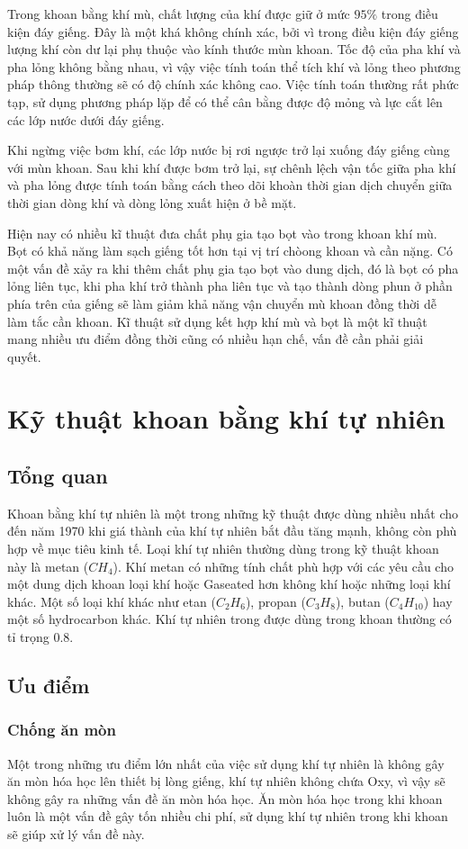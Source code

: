 \documentclass[13pt,a4paper]{article}
\begin{document}
	Trong khoan bằng khí mù, chất lượng của khí được giữ ở mức $95\%$ trong điều kiện đáy giếng. Đây là một khá không chính xác, bởi vì trong điều kiện đáy giếng lượng khí còn dư lại phụ thuộc vào kính thước mùn khoan. Tốc độ của pha khí và pha lỏng không bằng nhau, vì vậy việc tính toán thể tích khí và lỏng theo phương pháp thông thường sẽ có độ chính xác không cao. Việc tính toán thường rất phức tạp, sử dụng phương pháp lặp để có thể cân bằng được độ mỏng và lực cắt lên các lớp nước dưới đáy giếng.\par
	Khi ngừng việc bơm khí, các lớp nước bị rơi ngược trở lại xuống đáy giếng cùng với mùn khoan. Sau khi khí được bơm trở lại, sự chênh lệch vận tốc giữa pha khí và pha lỏng được tính toán bằng cách theo dõi khoàn thời gian dịch chuyển giữa thời gian dòng khí và dòng lỏng xuất hiện ở bề mặt.\par
	Hiện nay có nhiều kĩ thuật đưa chất phụ gia tạo bọt vào trong khoan khí mù. Bọt có khả năng làm sạch giếng tốt hơn tại vị trí chòong khoan và cần nặng. Có một vấn đề xảy ra khi thêm chất phụ gia tạo bọt vào dung dịch, đó là bọt có pha lỏng liên tục, khi pha khí trở thành pha liên tục và tạo thành dòng phun ở phần phía trên của giếng sẽ làm giảm khả năng vận chuyển mù khoan đồng thời dễ làm tắc cần khoan. Kĩ thuật sử dụng kết hợp khí mù và bọt là một kĩ thuật mang nhiều ưu điểm đồng thời cũng có nhiều hạn chế, vấn đề cần phải giải quyết.
\section{Kỹ thuật khoan bằng khí tự nhiên}
\subsection{Tổng quan}
	Khoan bằng khí tự nhiên là một trong những kỹ thuật được dùng nhiều nhất cho đến năm 1970 khi giá thành của khí tự nhiên bắt đầu tăng mạnh, không còn phù hợp về mục tiêu kinh tế. Loại khí tự nhiên thường dùng trong kỹ thuật khoan này là metan ($CH_4$). Khí metan có những tính chất phù hợp với các yêu cầu cho một dung dịch khoan loại khí hoặc Gaseated hơn không khí hoặc những loại khí khác. Một số loại khí khác như etan ($C_2H_6$), propan ($C_3H_8$), butan ($C_4H_{10}$) hay một số hydrocarbon khác. Khí tự nhiên trong được dùng trong khoan thường có tỉ trọng 0.8.
\subsection{Ưu điểm}
\subsubsection{Chống ăn mòn}
	Một trong những ưu điểm lớn nhất của việc sử dụng khí tự nhiên là không gây ăn mòn hóa học lên thiết bị lòng giếng, khí tự nhiên không chứa Oxy, vì vậy sẽ không gây ra những vấn đề ăn mòn hóa học. Ăn mòn hóa học trong khi khoan luôn là một vấn đề gây tốn nhiều chi phí, sử dụng khí tự nhiên trong khi khoan sẽ giúp xử lý vấn đề này.
\end{document}
